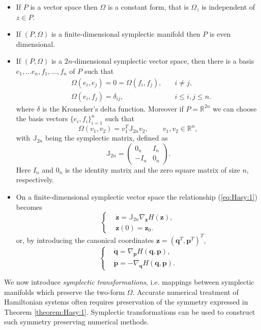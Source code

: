 \begin{itemize}
\item If $P$ is a vector space then $\Omega$ is a constant form, that is $\Omega_z$ is independent of $z\in P$. 
\item If $(P,\Omega)$ is a finite-dimensional symplectic manifold then $P$ is even dimensional.
\item If $(P,\Omega)$ is a $2n$-dimensional symplectic vector space, then there is a basis $e_1,\dots e_n,f_1, \dots , f_n$ of $P$ such that
\begin{equation} \label{eq:Hasy:4}
\begin{aligned}
	& \Omega(e_i,e_j) = 0 = \Omega(f_i,f_j), \quad & i\neq j,\\
	& \Omega(e_i,f_j) = \delta_{ij}, & i\leq i,j \leq n.
\end{aligned}
\end{equation}
where $\delta$ is the Kronecker's delta function. Moreover if $P = \mathbb{R}^{2n}$ we can choose the basis vectors $\{e_i,f_i\}_{i=1}^n$ such that
\begin{equation} \label{eq:Hasy:5}
	\Omega(v_1,v_2) = v_1^T \mathbb J_{2n} v_2, \qquad v_1,v_2\in \mathbb R^n,
\end{equation}
with $\mathbb J_{2n}$ being the symplectic matrix, defined as
\begin{equation} \label{eq:Hasy:6}
	\mathbb{J}_{2n} = 
	\begin{pmatrix}
		0_n & I_n \\
		-I_n & 0_n
	\end{pmatrix}.
\end{equation}
Here $I_n$ and $0_n$ is the identity matrix and the zero square matrix of size $n$, respectively.
\item On a finite-dimensional symplectic vector space the relationship (\ref{eq:Hasy:1}) becomes
\begin{equation} \label{eq:Hasy:7}
\left\{
\begin{aligned}
	&\dot {\mathbf z} = \mathbb{J}_{2n} \nabla_{\mathbf z} H(\mathbf z), \\
	& \mathbf z(0) = \mathbf z_0.
\end{aligned}
\right.
\end{equation}
or, by introducing the canonical coordinates $\mathbf z = (\mathbf q^T, \mathbf p^T)^T$,
\begin{equation} \label{eq:Hasy:8}
\left\{
\begin{aligned}
	&\dot {\mathbf q} = \nabla_{\mathbf p} H(\mathbf q,\mathbf p),\\
	&\dot {\mathbf p} = - \nabla_{\mathbf q} H(\mathbf q,\mathbf p).
\end{aligned}
\right.
\end{equation}
\end{itemize}
We now introduce \emph{symplectic transformations}, i.e. mappings between symplectic manifolds which preserve the two-form $\Omega$. Accurate numerical treatment of Hamiltonian systems often requires preservation of the symmetry expressed in Theorem \ref{theorem:Hasy:1}. Symplectic transformations can be used to construct such symmetry preserving numerical methods. 

